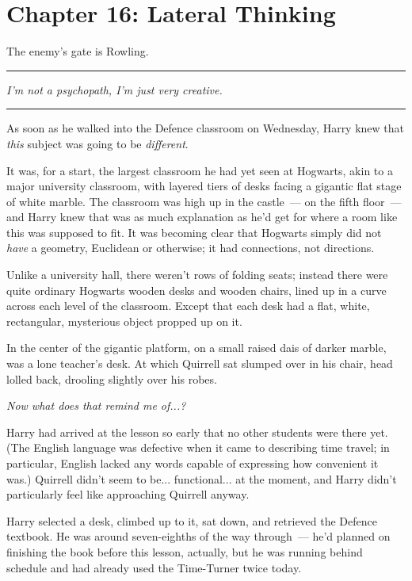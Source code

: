 \chapter{Chapter 16: Lateral Thinking}
The enemy's gate is Rowling.

\begin{center}\rule{3in}{0.4pt}\end{center}

\emph{I'm not a psychopath, I'm just very creative.}

\begin{center}\rule{3in}{0.4pt}\end{center}

As soon as he walked into the Defence classroom on Wednesday, Harry knew that \emph{this} subject was going to be \emph{different}.

It was, for a start, the largest classroom he had yet seen at Hogwarts, akin to a major university classroom, with layered tiers of desks facing a gigantic flat stage of white marble. The classroom was high up in the castle~--- on the fifth floor~--- and Harry knew that was as much explanation as he'd get for where a room like this was supposed to fit. It was becoming clear that Hogwarts simply did not \emph{have} a geometry, Euclidean or otherwise; it had connections, not directions.

Unlike a university hall, there weren't rows of folding seats; instead there were quite ordinary Hogwarts wooden desks and wooden chairs, lined up in a curve across each level of the classroom. Except that each desk had a flat, white, rectangular, mysterious object propped up on it.

In the center of the gigantic platform, on a small raised dais of darker marble, was a lone teacher's desk. At which Quirrell sat slumped over in his chair, head lolled back, drooling slightly over his robes.

\emph{Now what does that remind me of...?}

Harry had arrived at the lesson so early that no other students were there yet. (The English language was defective when it came to describing time travel; in particular, English lacked any words capable of expressing how convenient it was.) Quirrell didn't seem to be... functional... at the moment, and Harry didn't particularly feel like approaching Quirrell anyway.

Harry selected a desk, climbed up to it, sat down, and retrieved the Defence textbook. He was around seven-eighths of the way through~--- he'd planned on finishing the book before this lesson, actually, but he was running behind schedule and had already used the Time-Turner twice today.

